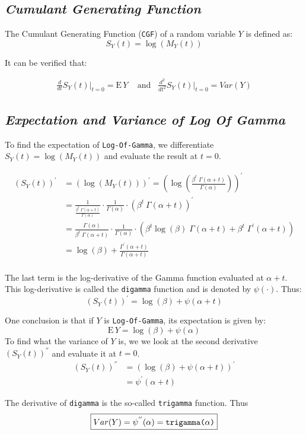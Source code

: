 \documentclass[12pt]{article}
\begin{document}
\subsection*{\color{TealBlue}\emph{Cumulant Generating Function} } 

The Cumulant Generating Function (\texttt{CGF}) of a random variable $Y$ is defined as:
$$
S_Y(t) = \log (M_Y(t))
$$

It can be verified that:


\begin{align*}
\frac{d}{dt} S_Y(t) \Big|_{t=0} = \mathrm{E}\, Y \;\;\; \text{ and} \;\;\; \frac{d^2}{dt^2} S_Y(t) \Big|_{t=0} = Var(Y) 
\end{align*}

\bigskip 
\bigskip 

\subsection*{\color{TealBlue}\emph{Expectation and Variance of Log Of Gamma} } 

To find the expectation of \texttt{Log-Of-Gamma}, we differentiate $S_Y(t) = \log (M_Y(t))$ and evaluate the result at $t = 0$.

\begin{align*}
(S_Y(t))^{'} &= (\log (M_Y(t)))^{'} = \left(\log \left(\frac{\beta^t \; \Gamma(\alpha + t)}{\Gamma(\alpha)} \right)\right)^{'} \\
&= \frac{1}{\frac{\beta^t \; \Gamma(\alpha + t)} {\Gamma(\alpha)}} \cdot \frac{1}{\Gamma(\alpha)} \cdot \left(  \beta^t \: \Gamma(\alpha + t)  \right)^{'}\\
&= \frac{\Gamma(\alpha)}{\beta^t \; \Gamma(\alpha + t)}  \cdot \frac{1}{\Gamma(\alpha)} \cdot \left(  \beta^t \log(\beta) \; \Gamma(\alpha + t) + \beta^t \; \Gamma^{'} (\alpha +t) \right)\\
&= \log(\beta) + \frac{\Gamma^{'} (\alpha +t) }{\Gamma(\alpha + t)}\\
\end{align*}


The last term is the log-derivative of the Gamma function evaluated at $\alpha + t$. This log-derivative is called the \texttt{digamma} function and is denoted by $\psi(\cdot)$. Thus:
$$
\boxed{(S_Y(t))^{'} =  \log(\beta) +\psi(\alpha +t)}
$$

One conclusion is that if $Y$ is \texttt{Log-Of-Gamma}, its expectation is given by:
$$
 \boxed{\mathrm{E}\, Y =  \log(\beta) +\psi(\alpha)}
$$
To find what the variance of $Y$ is, we we look at the second derivative $(S_Y(t))^{''}$ and evaluate it at $t=0$.
\begin{align*}
(S_Y(t))^{''} &= (\log(\beta) +\psi(\alpha +t))^{'}\\
&= \psi^{'}(\alpha +t)
\end{align*}

The derivative of \texttt{digamma} is the so-called \texttt{trigamma} function. Thus
$$
\boxed{Var(Y) = \psi^{''}(\alpha) = \text{\texttt{trigamma($\alpha$)}}}
$$
\end{document}
